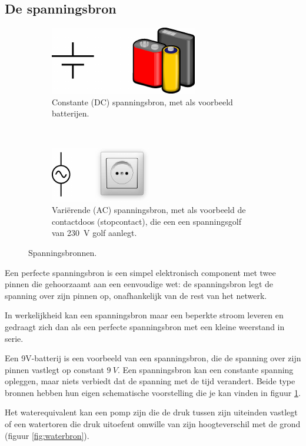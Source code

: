 \documentclass{article}
\begin{document}
		\subsection{De spanningsbron}

			\begin{figure}[hbtp]
				\centering
				\begin{subfigure}[b]{0.4\linewidth}
					\centering
					\includegraphics{vc}
					\caption{Constante (DC) spanningsbron, met als voorbeeld batterijen.}
				\end{subfigure}
				~
				\begin{subfigure}[b]{0.4\linewidth}
					\centering
					\includegraphics{vt}
					\caption{Vari\"erende (AC) spanningsbron, met als voorbeeld de contactdoos (stopcontact), die een een spanningsgolf van 230~V golf aanlegt.}
				\end{subfigure}
				\caption{Spanningsbronnen.}
				\label{fig:vbron}
			\end{figure}
			 Een perfecte spanningsbron is een simpel elektronisch component met twee pinnen die gehoorzaamt aan een eenvoudige wet: de spanningsbron legt de spanning over zijn pinnen op, onafhankelijk van de rest van het netwerk.
			 
			 In werkelijkheid kan een spanningsbron maar een beperkte stroom leveren en gedraagt zich dan als een perfecte spanningsbron met een kleine weerstand in serie. 
			 
			 Een 9V-batterij is een voorbeeld van een spanningsbron, die de spanning over zijn pinnen vastlegt op constant $9~V$. Een spanningsbron kan een constante spanning opleggen, maar niets verbiedt dat de spanning met de tijd verandert. Beide type bronnen hebben hun eigen schematische voorstelling die je kan vinden in figuur \ref{fig:vbron}.

			 Het waterequivalent kan een pomp zijn die de druk tussen zijn uiteinden vastlegt of een watertoren die druk uitoefent omwille van zijn hoogteverschil met de grond (figuur \ref{fig:waterbron}).
\end{document}
